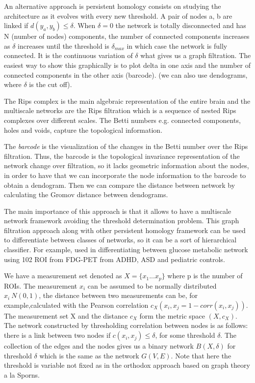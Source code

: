 \documentclass[onecollarge,runningheads]{svjour2}
\begin{document}
An alternative approach is persistent homology consists on studying the architecture as it evolves with every new threshold.
A pair of nodes a, b are linked if $d(y_a, y_b) \leq \delta$. When $\delta = 0$ the network is totally disconnected and has N (number of nodes) components, the number of connected components increases as $\delta$ increases until the threshold is $\delta_{max}$ in which case the network is fully connected. It is the continuous variation of $\delta$ what gives us a graph filtration. The easiest way to show this graphically is to plot delta in one axis and the number of connected components in the other axis (barcode). (we can also use dendograms, where $\delta$ is the cut off). 

The Rips complex is the main algebraic representation of the entire brain and the multiscale networks are the Rips filtration which is a sequence of nested Rips complexes over different scales. The Betti numbers e.g. connected components, holes and voids, capture the topological information. 

The \textit{barcode} is the visualization of the changes in the Betti number over the Rips filtration. Thus, the barcode is the topological invariance representation of the network change over filtration, so it lacks geometric information about the nodes, in order to have that we can incorporate the node information to the barcode to obtain a dendogram. Then we can compare the distance between network by calculating the Gromov distance between dendograms.

The main importance of this approach is that it allows to have a multiscale network framework avoiding the threshold determination problem.
This graph filtration approach along with other persistent homology framework can be used to differentiate between classes of networks, so it can be a sort of hierarchical classifier. For example, used in differentiating between glucose metabolic network using 102 ROI from FDG-PET from ADHD, ASD and pediatric controls.

We have a measurement set denoted as $X= \{ x_1 ... x_p\}$ where p is the number of ROIs. The measurement $x_i$ can be assumed to be normally distributed $x_i ~ N(0,1)$, the distance between two measurements can be, for example,calculated with the Pearson correlation $c_{X}(x_i,x_j= 1 - corr(x_i,x_j))$. 
The measurement set X and the distance $c_X$ form the metric space $(X,c_X)$. The network constructed by thresholding correlation between nodes is as follows:
there is a link between two nodes if $c(x_i,x_j) \leq \delta$, for some threshold $\delta$. The collection of the edges and the nodes gives us a binary network $B(X,\delta)$ for threshold $\delta$ which is the same as the network $G(V,E)$. Note that here the threshold is variable not fixed as in the orthodox approach based on graph theory a la Sporns.
\end{document}
